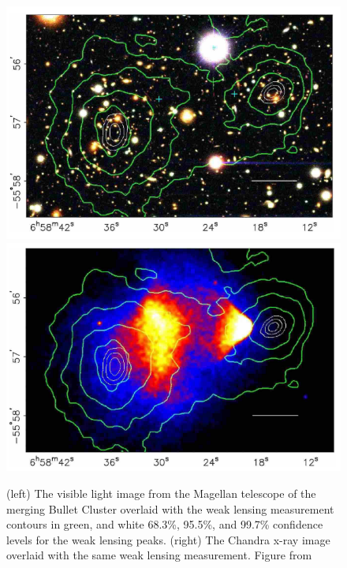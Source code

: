 \begin{figure}[htbp]
\begin{center}
\includegraphics[width=\halffig]{figures/theory/bullet1.png}
\includegraphics[width=\halffig]{figures/theory/bullet2.png}
\caption{(left) The visible light image from the Magellan telescope of the merging Bullet Cluster overlaid with the weak lensing measurement contours in green, and white 68.3\%, 95.5\%, and 99.7\% confidence levels for the weak lensing peaks. (right) The Chandra x-ray image overlaid with the same weak lensing measurement. Figure from \cite{Clowe2006} }
\label{fig:bullet}
\end{center}
\end{figure}


